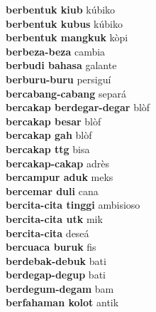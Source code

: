 \textbf{ berbentuk kiub  } kúbiko \\
\textbf{ berbentuk kubus  } kúbiko \\
\textbf{ berbentuk mangkuk  } kòpi \\
\textbf{ berbeza-beza  } cambia \\
\textbf{ berbudi bahasa  } galante \\
\textbf{ berburu-buru  } persiguí \\
\textbf{ bercabang-cabang  } separá \\
\textbf{ bercakap berdegar-degar  } blòf \\
\textbf{ bercakap besar  } blòf \\
\textbf{ bercakap gah  } blòf \\
\textbf{ bercakap ttg  } bisa \\
\textbf{ bercakap-cakap  } adrès \\
\textbf{ bercampur aduk  } meks \\
\textbf{ bercemar duli  } cana \\
\textbf{ bercita-cita tinggi  } ambisioso \\
\textbf{ bercita-cita utk  } mik \\
\textbf{ bercita-cita  } deseá \\
\textbf{ bercuaca buruk  } fis \\
\textbf{ berdebak-debuk  } bati \\
\textbf{ berdegap-degup  } bati \\
\textbf{ berdegum-degam  } bam \\
\textbf{ berfahaman kolot  } antik \\
